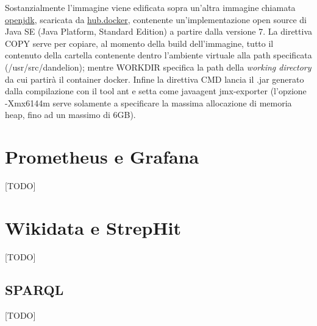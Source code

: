 Sostanzialmente l'immagine viene edificata sopra un'altra immagine chiamata \href{https://hub.docker.com/_/openjdk/}{openjdk}, scaricata da \href{https://hub.docker.com/}{hub.docker}, contenente 
un'implementazione open source di Java SE (Java Platform, Standard Edition) a partire dalla versione 7. 
La direttiva COPY serve per copiare, al momento della build dell'immagine, tutto il contenuto della cartella contenente dentro l'ambiente virtuale alla path specificata (/usr/src/dandelion); mentre WORKDIR specifica 
la path della \textit{working directory} da cui partirà il container docker. 
Infine la direttiva CMD lancia il .jar generato dalla compilazione con il tool ant e setta come javaagent jmx-exporter (l'opzione -Xmx6144m serve solamente a specificare la massima allocazione di memoria heap, fino ad un massimo di 6GB).   

\section{Prometheus e Grafana}
[TODO]

\section{Wikidata e StrepHit}
[TODO]

\subsection{SPARQL}
[TODO]
